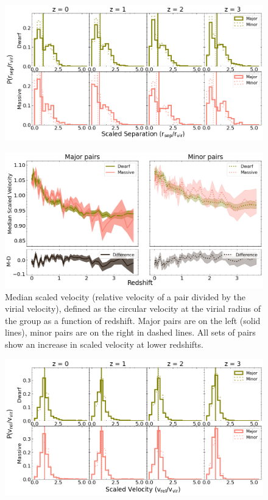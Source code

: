 \documentclass[twocolumn]{aastex631}
\begin{document}
\begin{figure}[htb]
  \centering
  \includegraphics[width=\textwidth]{scaledsep_distribution.png}
  \caption{}
  \label{fig:sep-scaled-dist}
\end{figure} 


\begin{figure}[htb]
  \centering
  \includegraphics[width=\textwidth]{scaledvel.png}
  \caption{Median scaled velocity (relative velocity of a pair divided by the virial velocity), defined as the circular velocity at the virial radius of the group as a function of redshift. 
  Major pairs are on the left (solid lines), minor pairs are on the right in dashed lines.
  All sets of pairs show an increase in scaled velocity at lower redshifts.
  }
  \label{fig:vel-scaled}
\end{figure} 

\begin{figure}[htb]
  \centering
  \includegraphics[width=\textwidth]{scaledvel_distribution.png}
  \caption{}
  \label{fig:vel-scaled-dist}
\end{figure} 
\end{document}
